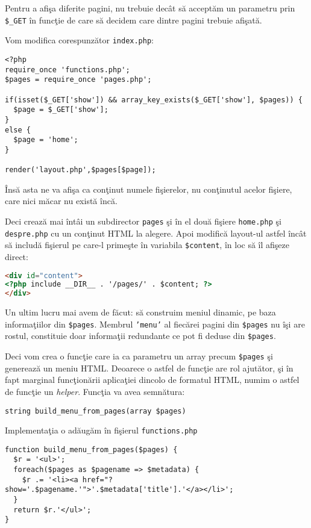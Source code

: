 Pentru a afişa diferite pagini, nu trebuie decât să acceptăm un
parametru prin \texttt{\$\_GET} în funcţie de care să
decidem care dintre pagini trebuie afişată.


Vom modifica corespunzător \texttt{index.php}:

\begin{lstlisting}[title=index.php]
<?php
require_once 'functions.php';
$pages = require_once 'pages.php';

if(isset($_GET['show']) && array_key_exists($_GET['show'], $pages)) {
  $page = $_GET['show'];
}
else {
  $page = 'home';
}

render('layout.php',$pages[$page]);
\end{lstlisting}
Însă asta ne va afişa ca conţinut numele fişierelor, nu conţinutul acelor
fişiere, care nici măcar nu există încă.

Deci crează mai întâi un subdirector \texttt{pages} şi în el două fişiere
\texttt{home.php} şi \texttt{despre.php} cu un conţinut HTML
la alegere. Apoi modifică layout-ul astfel încât să includă fişierul
pe care-l primeşte în variabila \texttt{\$content}, în loc să îl afişeze
direct:
\begin{lstlisting}[numbers=none,language=html]
<div id="content">
<?php include __DIR__ . '/pages/' . $content; ?>
</div>
\end{lstlisting}

Un ultim lucru mai avem de făcut: să construim meniul dinamic,
pe baza informaţiilor din \texttt{\$pages}. Membrul \texttt{'menu'}
al fiecărei pagini din \texttt{\$pages} nu îşi are rostul, constituie
doar informaţii redundante ce pot fi deduse din \texttt{\$pages}.

Deci vom crea o funcţie care ia ca parametru un array precum \texttt{\$pages}
şi generează un meniu HTML. Deoarece o astfel de funcţie
are rol ajutător, şi în fapt marginal funcţionării aplicaţiei
dincolo de formatul HTML, numim o astfel de funcţie un \textsl{helper}.
Funcţia va avea semnătura:
\begin{verbatim}
string build_menu_from_pages(array $pages)
\end{verbatim}
Implementaţia o adăugăm în fişierul \texttt{functions.php}
\begin{lstlisting}[numbers=none,title=functions.php]
function build_menu_from_pages($pages) {
  $r = '<ul>';
  foreach($pages as $pagename => $metadata) {
	$r .= '<li><a href="?show='.$pagename.'">'.$metadata['title'].'</a></li>';
  }
  return $r.'</ul>';
}
\end{lstlisting}


